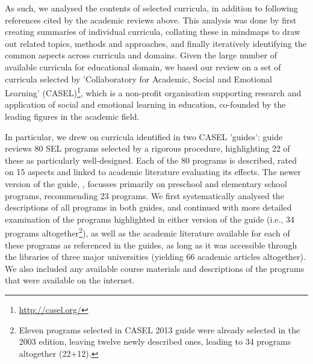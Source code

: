 \documentclass[prodmode,acmtochi]{acmsmall}
\newcommand{\GeraldineFIX}[1]{}
\newcommand{\GeraldineTODO}[1]{}
\begin{document}
As such, we analysed \GeraldineFIX{G: need to say more about HOW\ this analysis was done eg by creating summaries of programs, then collating comparative overviews of these in what (?) and then mindmaps to draw out related topics, methods etc .. from this identified common topics etc etc }the contents of selected curricula, in addition to following references cited by the academic reviews above. This analysis was done by first creating summaries of individual curricula, collating these in mindmaps to draw out related topics, methods and approaches, and finally iteratively identifying the common aspects across curricula and domains. 
%
Given the large number of available curricula for educational domain, we based our review on a set of curricula selected by 'Collaboratory for Academic, Social and Emotional Learning' (CASEL)\footnote{\url{http://casel.org/}}, which is a non-profit organisation supporting research and application of social and emotional learning in education, co-founded by the leading figures in the academic field. 

In particular, we drew on curricula identified in two CASEL 'guides':  guide reviews 80 SEL programs selected by a rigorous procedure, highlighting 22 of
 these as particularly well-designed. Each of the 80 programs is described, rated on 15 aspects and linked to academic literature evaluating its effects. The newer version of the guide, , focusses primarily on preschool and elementary school programs, recommending 23 programs.
%
We first systematically analysed the descriptions of all programs in both guides, and continued with more detailed examination of the programs highlighted in either version of the guide (i.e., 34 programs altogether\footnote{Eleven programs selected in CASEL 2013 guide were already selected in the 2003 edition, leaving twelve newly described ones, leading to 34 programs altogether (22+12). \GeraldineTODO{LIST\ THESE\ BY\ NAME\ HERE\ AS\ COMPLETE\ LIST?}}), as well as the academic literature available for each of these programs as referenced in the guides, as long as it was accessible through the libraries of three major universities (yielding 66 academic articles altogether). We also included any available course materials and descriptions of the programs that were available on the internet. 
\end{document}
